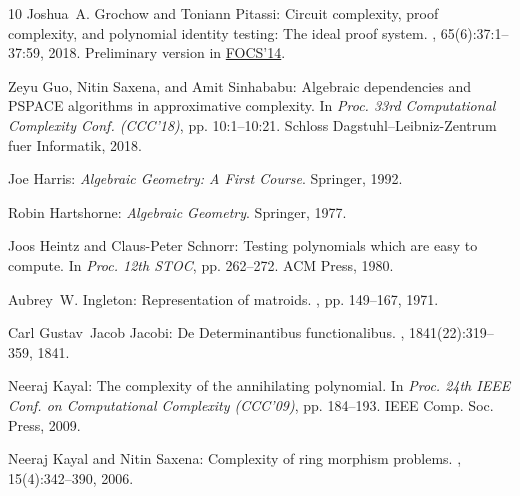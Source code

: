 \documentclass[11pt]{article}
\numberwithin{equation}{section}
\theoremstyle{definition}
\theoremstyle{plain}
\begin{document}
\begin{thebibliography}{10}
{\sc Joshua~A. Grochow and Toniann Pitassi}: Circuit complexity, proof
  complexity, and polynomial identity testing: {T}he ideal proof system.
, 65(6):37:1--37:59, 2018.
\newblock Preliminary version in
  \href{https://ieeexplore.ieee.org/document/6978995}{FOCS'14}.
\newblock [\epfmtdoi{10.1145/3230742}]

{\sc Zeyu Guo, Nitin Saxena, and Amit Sinhababu}: Algebraic dependencies and
  {PSPACE} algorithms in approximative complexity.
\newblock In {\em Proc. 33rd Computational Complexity Conf. (CCC'18)}, pp.
  10:1--10:21. Schloss Dagstuhl--Leibniz-Zentrum fuer Informatik, 2018.

{\sc Joe Harris}: {\em Algebraic Geometry: A First Course}.
\newblock Springer, 1992.
\newblock [\epfmtdoi{10.1007/978-1-4757-2189-8}]

{\sc Robin Hartshorne}: {\em Algebraic Geometry}.
\newblock Springer, 1977.
\newblock [\epfmtdoi{10.1007/978-1-4757-3849-0}]

{\sc Joos Heintz and Claus-Peter Schnorr}: Testing polynomials which are easy
  to compute.
\newblock In {\em Proc. 12th STOC}, pp. 262--272. ACM Press, 1980.
\newblock [\epfmtdoi{10.1145/800141.804674}]

{\sc Aubrey~W. Ingleton}: Representation of matroids.
, pp. 149--167,
  1971.

{\sc Carl Gustav~Jacob Jacobi}: De {D}eterminantibus functionalibus.
, 1841(22):319--359, 1841.

{\sc Neeraj Kayal}: The complexity of the annihilating polynomial.
\newblock In {\em Proc. 24th IEEE Conf. on Computational Complexity (CCC'09)},
  pp. 184--193. IEEE Comp. Soc. Press, 2009.

{\sc Neeraj Kayal and Nitin Saxena}: Complexity of ring morphism problems.
, 15(4):342--390, 2006.
\newblock [\epfmtdoi{10.1007/s00037-007-0219-8}]


\end{thebibliography}
\end{document}
